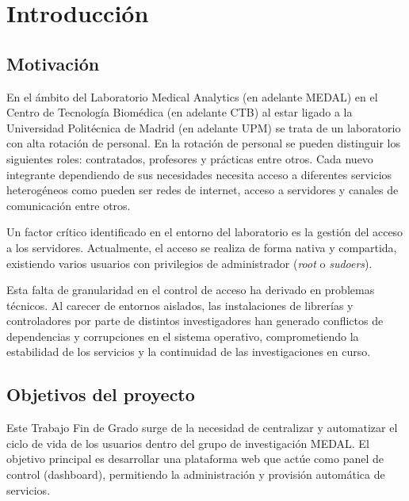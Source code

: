 \chapter{Introducción}
\section{Motivación}

En el ámbito del Laboratorio Medical Analytics (en adelante MEDAL) en el Centro de Tecnología Biomédica (en adelante CTB) al estar ligado a la Universidad Politécnica de Madrid (en adelante UPM) se trata de un laboratorio con alta rotación de personal. En la rotación de personal se pueden distinguir los siguientes roles: contratados, profesores y prácticas entre otros. Cada nuevo integrante dependiendo de sus necesidades necesita acceso a diferentes servicios heterogéneos como pueden ser redes de internet, acceso a servidores y canales de comunicación entre otros. 




Un factor crítico identificado en el entorno del laboratorio es la gestión del acceso a los servidores. Actualmente, el acceso se realiza de forma nativa y compartida, existiendo varios usuarios con privilegios de administrador (\textit{root} o \textit{sudoers}). 

Esta falta de granularidad en el control de acceso ha derivado en problemas técnicos. Al carecer de entornos aislados, las instalaciones de librerías y controladores por parte de distintos investigadores han generado conflictos de dependencias y corrupciones en el sistema operativo, comprometiendo la estabilidad de los servicios y la continuidad de las investigaciones en curso.





\section{Objetivos del proyecto}
Este Trabajo Fin de Grado surge de la necesidad de centralizar y automatizar el ciclo de vida de los usuarios dentro del grupo de investigación MEDAL. El objetivo principal es desarrollar una plataforma web que actúe como panel de control (dashboard), permitiendo la administración y provisión automática de servicios. 

